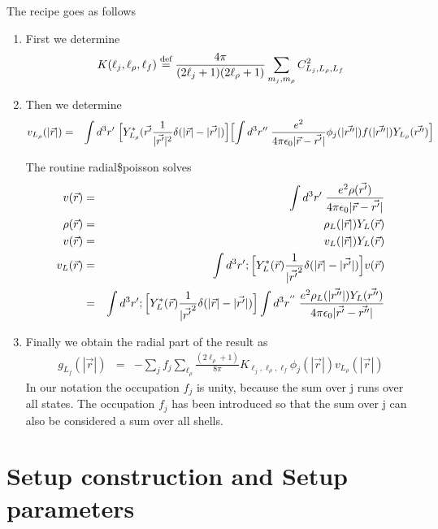 \documentclass[11pt,a4paper]{report}
\begin{document}
The recipe goes as follows 
\begin{enumerate}
\item First we determine
\begin{eqnarray*}
K(\ell_j,\ell_\rho,\ell_f)\stackrel{\text{def}}{=}
\frac{4\pi}{(2\ell_j+1)(2\ell_\rho+1)}\sum_{m_j,m_\rho}C_{L_j,L_\rho,L_f}^2
\end{eqnarray*}

\item Then we determine
\begin{eqnarray*}
v_{L_\rho}(|\vec{r}|)&=&
\int d^3r'\;\Bigl[Y^*_{L_\rho}(\vec{r'}\frac{1}{|\vec{r'}|^2}\delta(|\vec{r}|-|\vec{r'}|)\Bigr]
\Bigl[\int d^3r''\; \frac{e^2}
{4\pi\epsilon_0|\vec{r}-\vec{r'}|}
\phi_j(|\vec{r''}|)f(|\vec{r''}|)Y_{L_\rho}(\vec{r''})\Bigr]
\end{eqnarray*}

The routine radial\$poisson solves
\begin{eqnarray*}
v(\vec{r})&=&\int d^3r'\;\frac{e^2\rho(\vec{r'})}{4\pi\epsilon_0|\vec{r}-\vec{r'}|}
\\
\rho(\vec{r})&=&\rho_L(|\vec{r}|)Y_L(\vec{r})
\\
v(\vec{r})&=&v_L(|\vec{r}|)Y_L(\vec{r})
\\
v_L(\vec{r})
&=&\int d^3r'; \Bigl[Y^*_L(\vec{r})\frac{1}{|\vec{r'}^2}
\delta(|\vec{r}|-|\vec{r'}|)\Bigr]
v(\vec{r})
\\
&=&\int d^3r'; \Bigl[Y^*_L(\vec{r})\frac{1}{|\vec{r'}^2}
\delta(|\vec{r}|-|\vec{r'}|)\Bigr]
\int d^3r^{''}\;\frac{e^2\rho_L(|\vec{r''}|)Y_L(\vec{r''})}{4\pi\epsilon_0|\vec{r'}-\vec{r''}|}
\end{eqnarray*}

\item Finally we obtain the radial part of the result as
\begin{eqnarray*}
g_{L_f}(|\vec{r}|)&=&-\sum_{j}f_j\sum_{\ell_\rho}
\frac{(2\ell_\rho+1)}{8\pi}K_{\ell_j,\ell_\rho,\ell_f}
\phi_j(|\vec{r}|)v_{L_\rho}(|\vec{r}|)
\end{eqnarray*}
In our notation the
occupation $f_j$ is unity, because the sum over j runs over all
states.  The occupation $f_j$ has been introduced so that the sum over
j can also be considered a sum over all shells.
\end{enumerate}

\chapter{Setup construction and Setup parameters}
\end{document}
